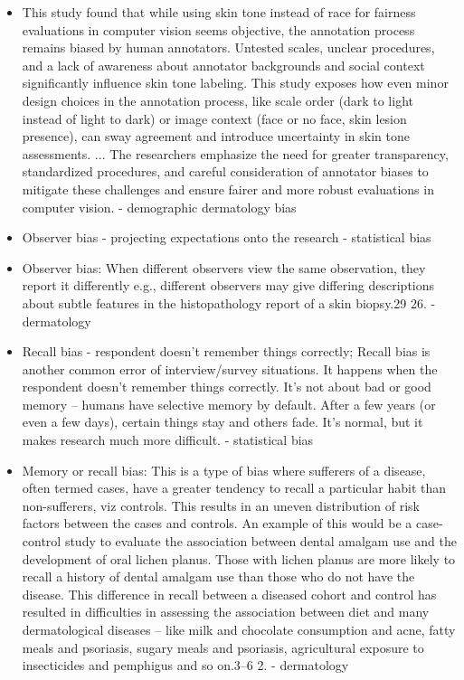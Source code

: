 \begin{refsection}
\begin{itemize}
			\item This study found that while using skin tone instead of race for fairness evaluations in computer vision seems objective, the annotation process remains biased by human annotators. Untested scales, unclear procedures, and a lack of awareness about annotator backgrounds and social context significantly influence skin tone labeling. This study exposes how even minor design choices in the annotation process, like scale order (dark to light instead of light to dark) or image context (face or no face, skin lesion presence), can sway agreement and introduce uncertainty in skin tone assessments. ... The researchers emphasize the need for greater transparency, standardized procedures, and careful consideration of annotator biases to mitigate these challenges and ensure fairer and more robust evaluations in computer vision. \autocite{Montoya_2025} - demographic dermatology bias
			
			\item Observer bias - projecting expectations onto the research \autocites{Mester_2022}{Mester_2017} - statistical bias
			\item  Observer bias: When different observers view the same observation, they report it differently e.g., different observers may give differing descriptions about subtle features in the histopathology report of a skin biopsy.29 26. \autocite{Chakraborty_2024} - dermatology
			
			\item Recall bias - respondent doesn't remember things correctly; Recall bias is another common error of interview/survey situations. It happens when the respondent doesn’t remember things correctly. It’s not about bad or good memory – humans have selective memory by default. After a few years (or even a few days), certain things stay and others fade. It’s normal, but it makes research much more difficult. 
			\autocites{Mester_2022}{Mester_2017} - statistical bias
			\item Memory or recall bias: This is a type of bias where sufferers of a disease, often termed cases, have a greater tendency to recall a particular habit than non-sufferers, viz controls. This results in an uneven distribution of risk factors between the cases and controls. An example of this would be a case-control study to evaluate the association between dental amalgam use and the development of oral lichen planus. Those with lichen planus are more likely to recall a history of dental amalgam use than those who do not have the disease. This difference in recall between a diseased cohort and control has resulted in difficulties in assessing the association between diet and many dermatological diseases – like milk and chocolate consumption and acne, fatty meals and psoriasis, sugary meals and psoriasis, agricultural exposure to insecticides and pemphigus and so on.3–6 2. \autocite{Chakraborty_2024} - dermatology
			

\end{itemize}
\end{refsection}
